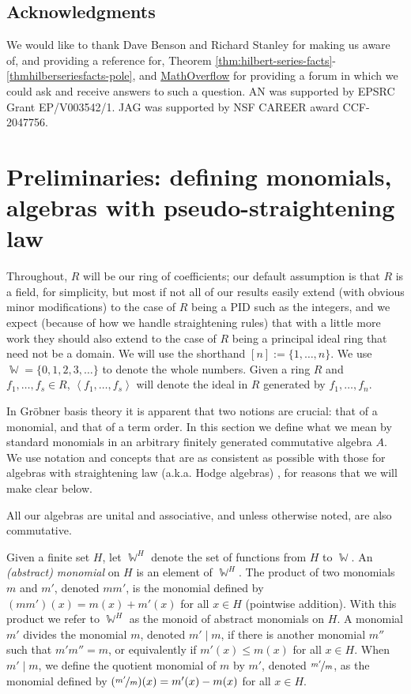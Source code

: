 \documentclass[11pt,reqno]{amsart}
\DeclareMathOperator{\W}{\mathbb{W}}
\newcommand{\ideal}[1]{\left\langle#1\right\rangle}
\newcommand{\divides}{\mid}
\theoremstyle{definition}
\numberwithin{equation}{section}
\begin{document}
\subsection{Acknowledgments} We would like to thank Dave Benson and Richard Stanley for making us aware of, and providing a reference for, Theorem \ref{thm:hilbert-series-facts}-\ref{thmhilberseriesfacts-pole}, and \href{https://mathoverflow.net/}{MathOverflow} for providing a forum in which we could ask and receive answers to such a question. AN was supported by EPSRC Grant EP/V003542/1. JAG was supported by NSF CAREER award CCF-2047756.



\section{Preliminaries: defining monomials, algebras with pseudo-straightening law} 
\begin{notation}
Throughout, $R$ will be our ring of coefficients; our default assumption is that $R$ is a field, for simplicity, but most if not all of our results easily extend (with obvious minor modifications) to the case of $R$ being a PID such as the integers, and we expect (because of how we handle straightening rules) that with a little more work they should also extend to the case of $R$ being a principal ideal ring that need not be a domain. We will use the shorthand $[n] := \{1, \ldots, n\}$. We use $\W = \{0,1,2,3,\dotsc\}$ to denote the whole numbers. Given a ring $R$ and $f_1, \ldots, f_s \in R$, $\ideal{f_1, \ldots, f_s}$ will denote the ideal in $R$ generated by $f_1, \ldots, f_n$.
\end{notation}

In Gröbner basis theory it is apparent that two notions are crucial: that of a monomial, and that of a term order. In this section we define what we mean by standard monomials in an arbitrary finitely generated commutative algebra $A$. We use notation and concepts that are as consistent as possible with those for algebras with straightening law (a.k.a. Hodge algebras) \cite{deconcini1987hodge, eisenbud-intro-1980}, for reasons that we will make clear below.

All our algebras are unital and associative, and unless otherwise noted, are also commutative.

Given a finite set $H$, let $\W^H$ denote the set of functions from $H$ to $\W$. An \emph{(abstract) monomial} on $H$ is an element of $\W^{H}$. The product of two monomials $m$ and $m'$, denoted $mm'$, is the monomial defined by $(mm')(x) = m(x) + m'(x)$ for all $x \in H$ (pointwise addition). With this product we refer to $\W^H$ as the monoid of abstract monomials on $H$. A monomial $m'$ divides the monomial $m$, denoted $m' \divides m$, if there is another monomial $m''$ such that $m'm''=m$, or equivalently if $m'(x) \le m(x)$ for all $x \in H$. When $m' \divides m$, we define the quotient monomial of $m$ by $m'$, denoted $\nicefrac{m'}{m}$, as the monomial defined by $(\nicefrac{m'}{m})(x) = m'(x) - m(x)$ for all $x \in H$. 
\end{document}
